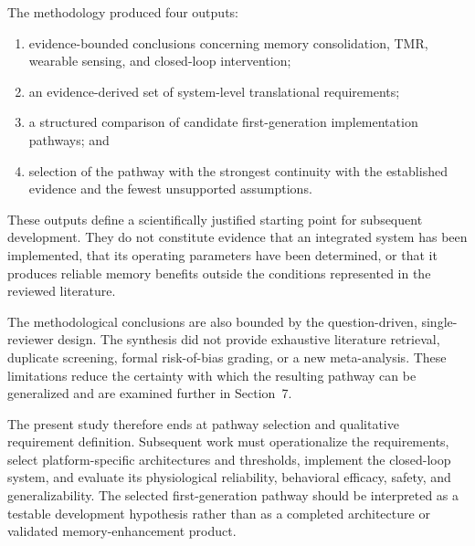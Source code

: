 The methodology produced four outputs:

\begin{enumerate}
    \item evidence-bounded conclusions concerning memory consolidation, TMR,
    wearable sensing, and closed-loop intervention;

    \item an evidence-derived set of system-level translational requirements;

    \item a structured comparison of candidate first-generation implementation
    pathways; and

    \item selection of the pathway with the strongest continuity with the
    established evidence and the fewest unsupported assumptions.
\end{enumerate}

These outputs define a scientifically justified starting point for subsequent
development. They do not constitute evidence that an integrated system has been
implemented, that its operating parameters have been determined, or that it
produces reliable memory benefits outside the conditions represented in the
reviewed literature.

The methodological conclusions are also bounded by the question-driven,
single-reviewer design. The synthesis did not provide exhaustive literature
retrieval, duplicate screening, formal risk-of-bias grading, or a new
meta-analysis. These limitations reduce the certainty with which the resulting
pathway can be generalized and are examined further in Section~7.

The present study therefore ends at pathway selection and qualitative
requirement definition. Subsequent work must operationalize the requirements,
select platform-specific architectures and thresholds, implement the
closed-loop system, and evaluate its physiological reliability, behavioral
efficacy, safety, and generalizability. The selected first-generation pathway
should be interpreted as a testable development hypothesis rather than as a
completed architecture or validated memory-enhancement product.